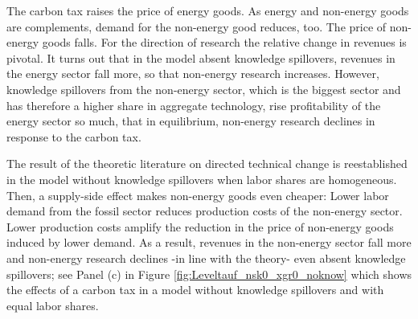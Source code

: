  The carbon tax raises the price of energy goods. As energy and non-energy goods are complements, demand for the non-energy good reduces, too. The price of non-energy goods falls. For the direction of research the relative change in revenues is pivotal. 
	It turns out that in the model absent knowledge spillovers, revenues in the energy sector fall more, so that non-energy research increases. However, knowledge spillovers from the non-energy sector, which is the biggest sector and has therefore a higher share in aggregate technology, rise profitability of the energy sector so much, that in equilibrium, non-energy research declines in response to the carbon tax. 
	
	The result of the theoretic literature on directed technical change is reestablished in the model without knowledge spillovers when labor shares are homogeneous. Then, a supply-side effect makes non-energy goods even cheaper: Lower labor demand from the fossil sector reduces production costs of the non-energy sector. Lower production costs amplify the reduction in the price of non-energy goods induced by lower demand.  As a result, revenues in the non-energy sector fall more and non-energy research declines -in line with the theory- even absent knowledge spillovers; see Panel (c) in Figure \ref{fig:Leveltauf_nsk0_xgr0_noknow} which shows the effects of a carbon tax in a model without knowledge spillovers and with equal labor shares. 
\clearpage
\thispagestyle{empty}
